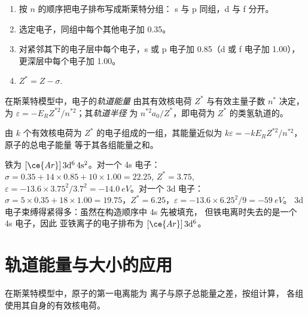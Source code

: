\begin{method}[计算有效核电荷]\label{met:b2:atomic-orbitals:slater}
\begin{enumerate}
  \item 按 $n$ 的顺序把电子排布写成斯莱特分组：
        s 与 p 同组，d 与 f 分开。
  \item 选定电子，同组中每个其他电子加 0.35。
  \item 对紧邻其下的电子层中每个电子，s 或 p 电子加 0.85（d 或 f 电子加 1.00），
        更深层中每个电子加 1.00。
  \item $Z^* = Z - \sigma$.
\end{enumerate}
\end{method}

\begin{definition}[轨道能量与半径]\label{def:b2:atomic-orbitals:orbital-energy}
在斯莱特模型中，电子的\emph{轨道能量}
由其有效核电荷 $Z^*$ 与有效主量子数 $n^*$ 决定，
为 $\varepsilon = -E_RZ^{*2}/n^{*2}$；其\emph{轨道半径}
为 $n^{*2}a_0/Z^*$，即电荷为
$Z^*$ 的类氢轨道的。
\end{definition}

\begin{proposition}[斯莱特能量]\label{prop:b2:atomic-orbitals:slater-energy}
由 $k$ 个有效核电荷为 $Z^*$ 的电子组成的一组，其能量近似为
$k\varepsilon = -kE_RZ^{*2}/n^{*2}$，原子的总电子能量
等于其各组能量之和。
\end{proposition}

\admitted

\begin{example}[铁：先填 4s 还是 3d？]\label{ex:b2:atomic-orbitals:iron}
铁为 $[\ce{Ar}]\,3\mathrm d^6\,4\mathrm s^2$。对一个 4s 电子：$\sigma = 0.35 + 14
\times 0.85 + 10 \times 1.00 = 22.25$, $Z^* = 3.75$, $\varepsilon = -13.6 \times
3.75^2/3.7^2 = \qty{-14.0}{eV}$。对一个 3d 电子：$\sigma = 5 \times 0.35 + 18 \times 1.00 =
19.75$，$Z^* = 6.25$，$\varepsilon = -13.6 \times 6.25^2/9 = \qty{-59}{eV}$。
3d 电子束缚得紧得多：虽然在构造顺序中 4s 先被填充，
但铁电离时失去的是一个 4s 电子，因此
亚铁离子的电子排布为 $[\ce{Ar}]\,3\mathrm d^6$。
\end{example}

\section{轨道能量与大小的应用}

\begin{proposition}[由斯莱特能量求电离能]\label{prop:b2:atomic-orbitals:ionisation}
在斯莱特模型中，原子的第一电离能为
离子与原子总能量之差，按组计算，
各组使用其自身的有效核电荷。
\end{proposition}

